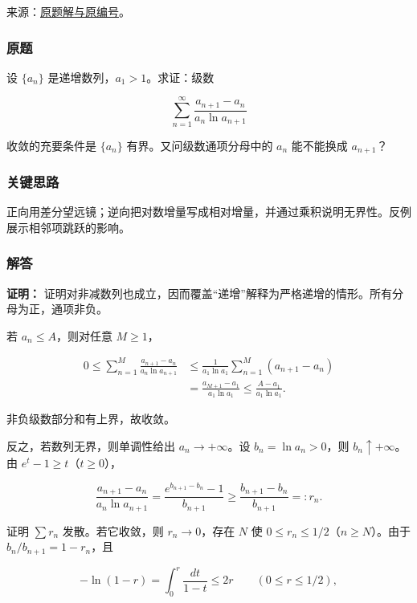 \documentclass[11pt,a4paper]{article}
\begin{document}
来源：\href{https://zj139.github.io/math-notes/problems/f22fb7377267be47a9e8df4f/\#问题-b224}{原题解与原编号}。

\subsubsection{原题}\label{ux539fux9898-27}

设 \(\{a_n\}\) 是递增数列，\(a_1>1\)。求证：级数

\[
\sum_{n=1}^{\infty}\frac{a_{n+1}-a_n}{a_n\ln a_{n+1}}
\]

收敛的充要条件是 \(\{a_n\}\) 有界。又问级数通项分母中的 \(a_n\)
能不能换成 \(a_{n+1}\)？

\subsubsection{关键思路}\label{ux5173ux952eux601dux8def-27}

正向用差分望远镜；逆向把对数增量写成相对增量，并通过乘积说明无界性。反例展示相邻项跳跃的影响。

\subsubsection{解答}\label{ux89e3ux7b54-27}

\textbf{证明：}
证明对非减数列也成立，因而覆盖``递增''解释为严格递增的情形。所有分母为正，通项非负。

若 \(a_n\le A\)，则对任意 \(M\ge1\)，

\[
\begin{aligned}
0\le\sum_{n=1}^{M}\frac{a_{n+1}-a_n}{a_n\ln a_{n+1}}
&\le\frac1{a_1\ln a_1}\sum_{n=1}^{M}(a_{n+1}-a_n)\\
&=\frac{a_{M+1}-a_1}{a_1\ln a_1}
\le\frac{A-a_1}{a_1\ln a_1}.
\end{aligned}
\]

非负级数部分和有上界，故收敛。

反之，若数列无界，则单调性给出 \(a_n\to+\infty\)。设
\(b_n=\ln a_n>0\)，则 \(b_n\uparrow+\infty\)。由
\(e^t-1\ge t\)（\(t\ge0\)），

\[
\frac{a_{n+1}-a_n}{a_n\ln a_{n+1}}
=\frac{e^{b_{n+1}-b_n}-1}{b_{n+1}}
\ge\frac{b_{n+1}-b_n}{b_{n+1}}=:r_n.
\]

证明 \(\sum r_n\) 发散。若它收敛，则 \(r_n\to0\)，存在 \(N\) 使
\(0\le r_n\le1/2\)（\(n\ge N\)）。由于 \(b_n/b_{n+1}=1-r_n\)，且

\[
-\ln(1-r)=\int_0^r\frac{dt}{1-t}\le2r
\qquad(0\le r\le1/2),
\]
\end{document}
